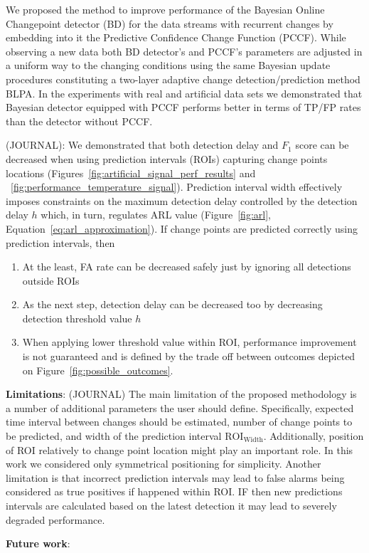 We proposed the method to improve performance of the Bayesian Online Changepoint detector (BD) for the data streams with recurrent changes by embedding into it the Predictive Confidence Change Function (PCCF).
While observing a new data both BD detector's and PCCF's parameters are adjusted in a uniform way to the changing conditions using the same Bayesian update procedures constituting a two-layer adaptive change detection/prediction method BLPA.
In the experiments with real and artificial data sets we demonstrated that Bayesian detector equipped with PCCF performs better in terms of TP/FP rates than the detector without PCCF.

(JOURNAL): 
We demonstrated that both detection delay and $F_1$ score can be decreased when using prediction intervals (ROIs) capturing change points locations (Figures~\ref{fig:artificial_signal_perf_results} and ~\ref{fig:performance_temperature_signal}).
Prediction interval width effectively imposes constraints on the maximum detection delay controlled by the detection delay $h$ which, in turn, regulates ARL value (Figure~\ref{fig:arl}, Equation~\ref{eq:arl_approximation}).
If change points are predicted correctly using prediction intervals, then
\begin{enumerate}
    \item At the least, FA rate can be decreased safely just by ignoring all detections outside ROIs
    \item As the next step, detection delay can be decreased too by decreasing detection threshold value $h$ 
    \item When applying lower threshold value within ROI, performance improvement is not guaranteed and is defined by the trade off between outcomes depicted on Figure~\ref{fig:possible_outcomes}.
\end{enumerate}

\textbf{Limitations}:
(JOURNAL)
The main limitation of the proposed methodology is a number of additional parameters the user should define.
Specifically, expected time interval between changes should be estimated, number of change points to be predicted, and width of the prediction interval $\text{ROI}_{\text{Width}}$.
Additionally, position of ROI relatively to change point location might play an important role. In this work we considered only symmetrical positioning for simplicity.
Another limitation is that incorrect prediction intervals may lead to false alarms being considered as true positives if happened within ROI. IF then new predictions intervals are calculated based on the latest detection it may lead to severely degraded performance. 

\textbf{Future work}:
